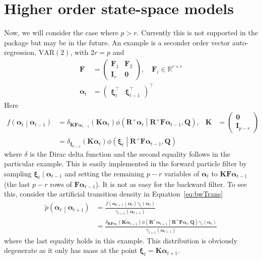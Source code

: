 \documentclass[notitlepage]{article}
\renewcommand{\vec}[1]{\bm{#1}}
\newcommand{\mat}[1]{\mathbf{#1}}
\newcommand{\Lparen}[1]{\left( #1\right)}
\newcommand{\Cond}[2]{ #1 \middle\vert  #2}
\newcommand{\optor}[2]{#1\Lparen{#2}}
\newcommand{\optorC}[3]{\optor{#1}{\Cond{#2}{#3}}}
\newcommand{\pdenstC}[2]{\optorC{\widetilde p}{#1}{#2}}
\newcommand{\normaldC}[3]{\optorC{\phi}{#1}{#2,#3}}
\newcommand\dirac[2]{\optor{\delta_{#1}}{#2}}
\newcommand{\dimState}{p}
\newcommand{\dimRng}{r}
\newcommand\MVAR[1]{\optor{\text{VAR}}{#1}}
\begin{document}
\section{Higher order state-space models}
Now, we will consider the case where $\dimState > \dimRng$. 
Currently this is not supported in the package but may be in the future. 
An example is a seconder 
order vector auto-regression, $\MVAR{2}$, with $2\dimRng = \dimState$ and %
%
\begin{align*}
\mat F &= \begin{pmatrix}
		\mat F_1 & \mat F_2 \\
		\mat I_\dimRng & \mat 0
	\end{pmatrix}, \quad \mat F_i \in \mathbb{R}^{\dimRng\times\dimRng} \\
\vec\alpha_t &= \begin{pmatrix}
	\vec\xi_t^\top & \vec\xi_{t-1}^\top
\end{pmatrix}^\top
\end{align*}%
%
Here %
%
\begin{align*}
\optorC{f}{\vec\alpha_t}{\vec\alpha_{t - 1}} &= 
	\dirac{\mat K\mat F\vec\alpha_{t-1}}{\mat K\vec\alpha_t}
	\normaldC{\mat R^+\vec\alpha_t}{
		\mat R^+\mat F\vec\alpha_{t-1}}{\mat Q}, 
	& \mat K &=
		\begin{pmatrix} \mat 0 \\ \mat I_{\dimState - \dimRng} \end{pmatrix}  \\
&= \dirac{\vec \xi_{t-1}}{\mat K\vec\alpha_t}
	\normaldC{\vec\xi_t}{\mat R^+\mat F\vec\alpha_{t-1}}{\mat Q}
\end{align*}%
%
where $\delta$ is the Dirac delta function and the second equality follows in the particular
example. This is easily implemented in the forward 
particle filter by sampling $\vec\xi_t \mid \vec\alpha_{t-1}$ and setting the remaining
$\dimState - \dimRng$ variables of $\vec\alpha_t$ to 
$\mat K\mat F\vec\alpha_{t-1}$ (the last $\dimState - \dimRng$ rows of 
$\mat F\vec\alpha_{t-1}$). It is not as easy for the backward filter. To see this, consider the artificial transition density in Equation~\eqref{eq:bwTrans}%
%
\begin{align*}
\pdenstC{\vec{\alpha}_t}{\vec{\alpha}_{t+1}} &= 
	\frac{
		\optorC{f}{\vec\alpha_{t+1}}{\vec\alpha_t}
		\gamma_t(\vec\alpha_t)
	}{\gamma_{t+1}(\vec\alpha_{t + 1})} \\
& = \frac{
		\dirac{\mat K\mat F\vec\alpha_t}{\mat K\vec\alpha_{t + 1}}
		\normaldC{\mat R^+\vec\alpha_{t +1}}{
			\mat R^+\mat F\vec\alpha_t}{\mat Q}
		\gamma_t(\vec\alpha_t)
	}{\gamma_{t+1}(\vec\alpha_{t + 1})}
\end{align*}%
%
where the last equality holds in this example. This distribution is obviously degenerate 
as it only has mass at the point $\vec\xi_t = \mat K\vec\alpha_{t + 1}$. 
\end{document}
